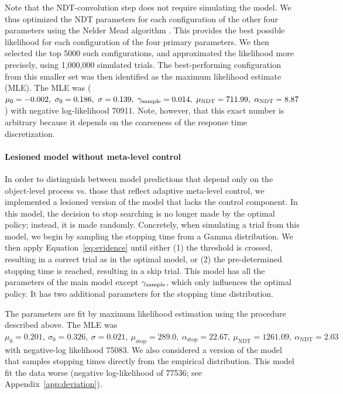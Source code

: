 Note that the NDT-convolution step does not require simulating the model. We thus optimized the NDT parameters for each configuration of the other four parameters using the Nelder Mead algorithm \citep{nelder1965simplex}. This provides the best possible likelihood for each configuration of the four primary parameters. We then selected the top 5000 such configurations, and approximated the likelihood more precisely, using 1,000,000 simulated trials. The best-performing configuration from this smaller set was then identified as the maximum likelihood estimate (MLE). The MLE was (\(
            \mu_0 = -0.002,\ 
            \sigma_0 = 0.186,\ 
            \sigma = 0.139,\ 
            \samplecost = 0.014,\ 
            \mu_\text{NDT} = 711.99,\ 
            \alpha_\text{NDT} = 8.87
        \)) with negative log-likelihood 70911. Note, however, that this exact number is arbitrary because it depends on the coarseness of the response time discretization.

\paragraph{Lesioned model without meta-level control}

In order to distinguish between model predictions that depend only on the object-level process vs. those that reflect adaptive meta-level control, we implemented a lesioned version of the model that lacks the control component. In this model, the decision to stop searching is no longer made by the optimal policy; instead, it is made randomly. Concretely, when simulating a trial from this model, we begin by sampling the stopping time from a Gamma distribution. We then apply Equation~\ref{eq:evidence} until either (1) the threshold is crossed, resulting in a correct trial as in the optimal model, or (2) the pre-determined stopping time is reached, resulting in a skip trial. This model has all the parameters of the main model except $\gamma_\text{sample}$, which only influences the optimal policy. It has two additional parameters for the stopping time distribution.

The parameters are fit by maximum likelihood estimation using the procedure described above. The MLE was \(
            \mu_0 = 0.201,\ 
            \sigma_0 = 0.326,\ 
            \sigma = 0.021,\ 
            \mu_\text{stop} = 289.0,\ 
            \alpha_\text{stop} = 22.67,\ 
            \mu_\text{NDT} = 1261.09,\ 
            \alpha_\text{NDT} = 2.03
        \) with negative-log likelihood 75083. We also considered a version of the model that samples stopping times directly from the empirical distribution. This model fit the data worse (negative log-likelihood of 77536; see Appendix~\ref{app:deviation}).

